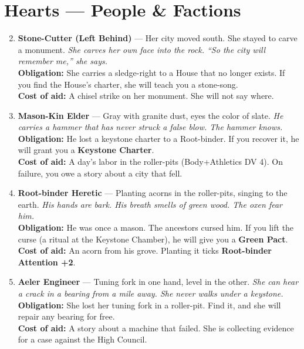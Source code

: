 \section*{Hearts --- People \& Factions}
\label{sec:ngomebe-people}
\begin{enumerate}
\setcounter{enumi}{1}
\item \textbf{Stone-Cutter (Left Behind)} --- Her city moved south. She stayed to carve a monument.
  \hfill \textit{She carves her own face into the rock. ``So the city will remember me,'' she says.} \\
  \textbf{Obligation:} She carries a sledge-right to a House that no longer exists. If you find the House's charter, she will teach you a stone-song. \\
  \textbf{Cost of aid:} A chisel strike on her monument. She will not say where.

\item \textbf{Mason-Kin Elder} --- Gray with granite dust, eyes the color of slate.
  \hfill \textit{He carries a hammer that has never struck a false blow. The hammer knows.} \\
  \textbf{Obligation:} He lost a keystone charter to a Root-binder. If you recover it, he will grant you a \textbf{Keystone Charter}. \\
  \textbf{Cost of aid:} A day's labor in the roller-pits (Body+Athletics DV 4). On failure, you owe a story about a city that fell.

\item \textbf{Root-binder Heretic} --- Planting acorns in the roller-pits, singing to the earth.
  \hfill \textit{His hands are bark. His breath smells of green wood. The oxen fear him.} \\
  \textbf{Obligation:} He was once a mason. The ancestors cursed him. If you lift the curse (a ritual at the Keystone Chamber), he will give you a \textbf{Green Pact}. \\
  \textbf{Cost of aid:} An acorn from his grove. Planting it ticks \textbf{Root-binder Attention +2}.

\item \textbf{Aeler Engineer} --- Tuning fork in one hand, level in the other.
  \hfill \textit{She can hear a crack in a bearing from a mile away. She never walks under a keystone.} \\
  \textbf{Obligation:} She lost her tuning fork in a roller-pit. Find it, and she will repair any bearing for free. \\
  \textbf{Cost of aid:} A story about a machine that failed. She is collecting evidence for a case against the High Council.


\end{enumerate}
